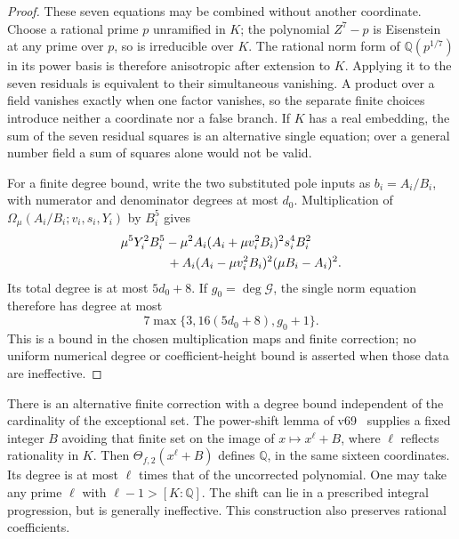 \documentclass[11pt,a4paper]{article}
\newcommand{\Q}{\mathbb Q}\newcommand{\Z}{\mathbb Z}
\begin{document}
\begin{proof}
These seven equations may be combined without another coordinate.
Choose a rational prime $p$ unramified in $K$; the polynomial $Z^7-p$
is Eisenstein at any prime over $p$, so is irreducible over $K$.
The rational norm form of $\Q(p^{1/7})$ in its power basis is therefore
anisotropic after extension to $K$. Applying it to the seven residuals
is equivalent to their simultaneous vanishing. A product over a field
vanishes exactly when one factor vanishes, so the separate finite choices
introduce neither a coordinate nor a false branch. If $K$ has a real
embedding, the sum of the seven residual squares is an alternative
single equation; over a general number field a sum of squares alone
would not be valid.

For a finite degree bound, write the two substituted pole inputs as
$b_i=A_i/B_i$, with numerator and denominator degrees at most $d_0$.
Multiplication of $\Omega_\mu(A_i/B_i;v_i,s_i,Y_i)$ by $B_i^5$ gives
\[
\begin{split}
 &\mu^5Y_i^2B_i^5
 -\mu^2A_i(A_i+\mu v_i^2B_i)^2s_i^4B_i^2\\
 &\hspace{13mm}+A_i(A_i-\mu v_i^2B_i)^2(\mu B_i-A_i)^2.
\end{split}
\]
Its total degree is at most $5d_0+8$. If $g_0=\deg\mathcal G$, the
single norm equation therefore has degree at most
\[
                 7\max\{3,16(5d_0+8),g_0+1\}.
\]
This is a bound in the chosen multiplication maps and finite correction;
no uniform numerical degree or coefficient-height bound is asserted when
those data are ineffective.
\end{proof}

There is an alternative finite correction with a degree bound independent
of the cardinality of the exceptional set. The power-shift lemma of
v69~\cite{v69} supplies a fixed integer $B$ avoiding that finite set
on the image of $x\mapsto x^\ell+B$, where $\ell$ reflects rationality
in $K$. Then $\Theta_{f,2}(x^\ell+B)$ defines $\Q$, in the same sixteen
coordinates. Its degree is at most $\ell$ times that of the uncorrected
polynomial. One may take any prime $\ell$ with $\ell-1>[K:\Q]$.
The shift can lie in a prescribed integral progression, but is generally
ineffective. This construction also preserves rational coefficients.
\end{document}
